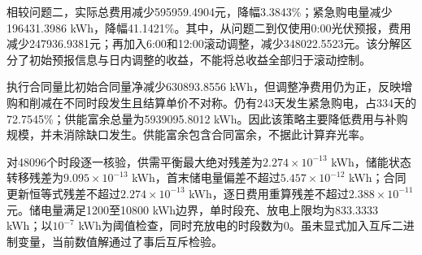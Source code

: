 相较问题二，实际总费用减少595959.4904元，降幅3.3843\%；紧急购电量减少196431.3986 kWh，降幅41.1421\%。其中，从问题二到仅使用0:00光伏预报，费用减少247936.9381元；再加入6:00和12:00滚动调整，减少348022.5523元。该分解区分了初始预报信息与日内调整的收益，不能将总收益全部归于滚动控制。

执行合同量比初始合同量净减少630893.8556 kWh，但调整净费用仍为正，反映增购和削减在不同时段发生且结算单价不对称。仍有243天发生紧急购电，占334天的72.7545\%；供能富余总量为5939095.8012 kWh。因此该策略主要降低费用与补购规模，并未消除缺口发生。供能富余包含合同富余，不据此计算弃光率。

对48096个时段逐一核验，供需平衡最大绝对残差为$2.274\times10^{-13}$ kWh，储能状态转移残差为$9.095\times10^{-13}$ kWh，首末储电量偏差不超过$5.457\times10^{-12}$ kWh；合同更新恒等式残差不超过$2.274\times10^{-13}$ kWh，逐日费用重算残差不超过$2.388\times10^{-11}$元。储电量满足1200至10800 kWh边界，单时段充、放电上限均为833.3333 kWh；以$10^{-7}$ kWh为阈值检查，同时充放电的时段数为0。虽未显式加入互斥二进制变量，当前数值解通过了事后互斥检验。

\endgroup
